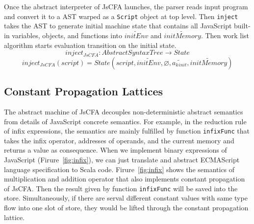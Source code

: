 \documentclass{article}
\begin{document}
Once the abstract interpreter of JsCFA launches, the parser reads input program and convert it to a AST warped as a \verb|Script| object at top level.
Then \verb|inject| takes the AST to generate initial machine state that contains all JavaScript built-in variables, objects, and functions into $\widetilde{initEnv}$ and $\widetilde{initMemory}$. Then work list algorithm starts evaluation transition on the initial state.
\[
inject_{JsCFA} : AbstractSyntaxTree \to State
\]
\[
inject_{JsCFA}(script) = State(script, \widetilde{initEnv}, \varnothing, \widetilde{a_k{}_{init}}, \widetilde{initMemory})
\]

\iffalse
\subsection{Constant Propagation Lattices}
\label{sub:Constant Propagation Lattices}

The abstract machine of JsCFA decouples non-deterministic abstract semantics from details of JavaScript concrete semantics. For example, in the reduction rule of infix expressions, the semantics are mainly fulfilled by function \verb|infixFunc| that takes the infix operator, addresses of operands, and the current memory and returns a value as consequence. When we implement binary expressions of JavaScript (Firure~\ref{fig:infix}), we can just translate and abstract ECMAScript language specification to Scala code. Firure~\ref{fig:infix} shows the semantics of multiplication and addition operator that also implements constant propagation of JsCFA\@. Then the result given by function \verb|infixFunc| will be saved into the store. Simultaneously, if there are serval different constant values with same type flow into one slot of store, they would be lifted through the constant propagation lattice.


\end{document}

